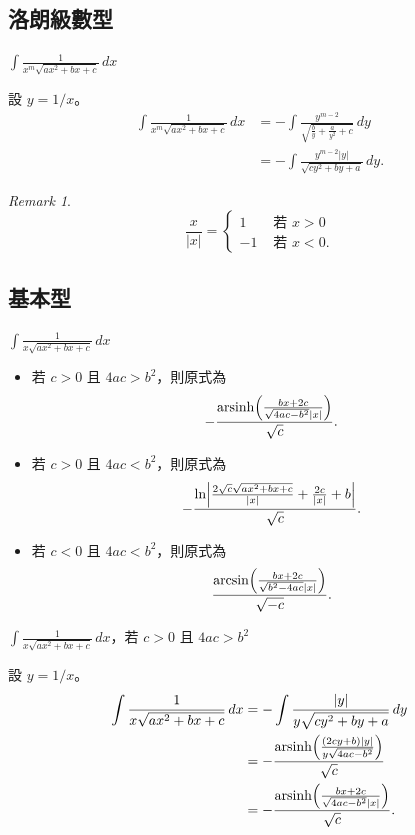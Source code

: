 \documentclass{beamer}
\newcommand{\Left} {\mathopen{}\mathclose\bgroup\left}
\newcommand{\Right}{\aftergroup\egroup\right}
\newcommand{\arsinh}{\operatorname{arsinh}}
\theoremstyle{remark}
\newtheorem{remark}{Remark}
\begin{document}
\begin{CJK}{UTF8}{bsmi}
\section{洛朗級數型}
\begin{frame}{$\displaystyle \int \frac{1}{x^m \sqrt{ax^2 + bx + c}}\,dx$}
  \begin{solution}
    設 $y = 1/x$。
    \begin{align*}
      \int \frac{1}{x^m \sqrt{ax^2 + bx + c}}\,dx &= -\int \frac{y^{m-2}}{\sqrt{\frac b y + \frac{a}{y^2} + c}}\,dy\\
	&= -\int \frac{y^{m-2} \left| y \right|}{\sqrt{cy^2 + by + a}}\,dy.
    \end{align*}
  \end{solution}
  \begin{remark}
    \[\frac{x}{|x|} = \begin{cases}1 & \mbox{ 若 }x > 0\\ -1 & \mbox{ 若 }x < 0.\end{cases}\]
  \end{remark}
\end{frame}

\subsection{基本型}
\begin{frame}{$\displaystyle \int \frac{1}{x \sqrt{ax^2 + bx + c}}\,dx$}
  \begin{itemize}
    \item 若 $c > 0$ 且 $4ac > b^2$，則原式為
      \[-\frac{\arsinh \Left( \frac{bx + 2c}{\sqrt{4ac - b^2} |x|} \Right)}{\sqrt c}.\]
    \item 若 $c > 0$ 且 $4ac < b^2$，則原式為
      \[-\frac{\ln \Left| \frac{2 \sqrt c \sqrt{ax^2 + bx + c}}{|x|} + \frac{2c}{|x|} + b \Right|}{\sqrt c}.\]
    \item 若 $c < 0$ 且 $4ac < b^2$，則原式為
      \[\frac{\arcsin \Left( \frac{bx + 2c}{\sqrt{b^2 - 4ac} |x|} \Right)}{\sqrt{-c}}.\]
  \end{itemize}
\end{frame}

\begin{frame}{$\displaystyle \int \frac{1}{x \sqrt{ax^2 + bx + c}}\,dx$，若 $c > 0$ 且 $4ac > b^2$}
  \begin{solution}
    設 $y = 1/x$。
    \begin{align*}
      \int \frac{1}{x \sqrt{ax^2 + bx + c}}\,dx &= -\int \frac{|y|}{y \sqrt{cy^2 + by + a}}\,dy\\
	&= -\frac{\arsinh \Left( \frac{\left( 2cy + b \right) |y|}{y \sqrt{4ac - b^2}} \Right)}{\sqrt c}\\
	&= -\frac{\arsinh \Left( \frac{bx + 2c}{\sqrt{4ac - b^2} |x|} \Right)}{\sqrt c}.
    \end{align*}
  \end{solution}
\end{frame}


\end{CJK}
\end{document}
